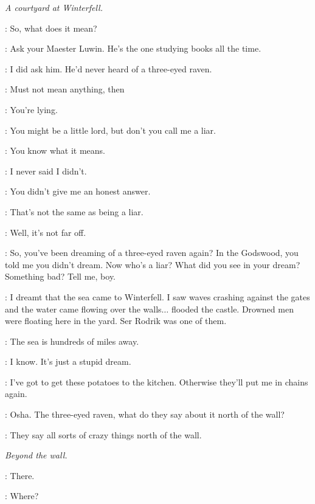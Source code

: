 

\scene

\textit{A courtyard at Winterfell.} 


\BRAN: So, what does it mean? 

\OSHA: Ask your Maester Luwin. He's the one studying books all the time. 

\BRAN: I did ask him. He'd never heard of a three-eyed raven. 

\OSHA: Must not mean anything, then 

\BRAN: You're lying. 

\OSHA: You might be a little lord, but don't you call me a liar. 

\BRAN: You know what it means. 

\OSHA: I never said I didn't. 

\BRAN: You didn't give me an honest answer. 

\OSHA: That's not the same as being a liar. 

\BRAN: Well, it's not far off. 

\OSHA: So, you've been dreaming of a three-eyed raven again? In the Godswood, you told me you didn't dream. Now who's a liar? What did you see in your dream? Something bad? Tell me, boy. 

\BRAN: I dreamt that the sea came to Winterfell. I saw waves crashing against the gates and the water came flowing over the walls$\ldots$ flooded the castle. Drowned men were floating here in the yard. Ser Rodrik was one of them. 

\OSHA: The sea is hundreds of miles away. 

\BRAN: I know. It's just a stupid dream. 

\OSHA: I've got to get these potatoes to the kitchen. Otherwise they'll put me in chains again. 

\BRAN: Osha. The three-eyed raven, what do they say about it north of the wall? 

\OSHA: They say all sorts of crazy things north of the wall. 



\scene

\textit{Beyond the wall.} 


\HALFHAND: There. 

\JEOR: Where? 

